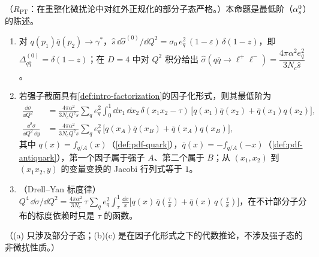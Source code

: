 \begin{proposition}\label{prop:dy-born}
（$R_{\mathrm{PT}}$：在重整化微扰论中对红外正规化的部分子态严格。）本命题是最低阶（$\alpha_s^0$）的陈述。
\begin{enumerate}[label=(\alph*),leftmargin=2.2em,itemsep=1pt,topsep=2pt]
\item 对 $q(p_1)\bar q(p_2)\to\gamma^*$，$\hat s\,\dd\hat\sigma^{(0)}/\dd Q^2=\sigma_0\,e_q^2\,(1-\varepsilon)\,\delta(1-z)$，即 $\Delta^{(0)}_{q\bar q}=\delta(1-z)$；在 $D=4$ 中对 $Q^2$ 积分给出 $\hat\sigma(q\bar q\to\ell^+\ell^-)=\dfrac{4\pi\alpha^2e_q^2}{3N_c\hat s}$。
\item 若强子截面具有\cref{def:intro-factorization}的因子化形式，则其最低阶为
\begin{align}
\frac{\dd\sigma}{\dd Q^2}&=\frac{4\pi\alpha^2}{3N_cQ^2s}\sum_qe_q^2\int_0^1\!\dd x_1\,\dd x_2\,\delta(x_1x_2-\tau)\,\big[q(x_1)\bar q(x_2)+\bar q(x_1)q(x_2)\big],\label{eq:dy-LO}\\
\frac{\dd^2\sigma}{\dd Q^2\,\dd y}&=\frac{4\pi\alpha^2}{3N_cQ^2s}\sum_qe_q^2\,\big[q(x_A)\bar q(x_B)+\bar q(x_A)q(x_B)\big],\label{eq:dy-LOy}
\end{align}
其中 $q(x)=f_{q/A}(x)$（\cref{def:pdf-quark}），$\bar q(x)=-f_{q/A}(-x)$（\cref{def:pdf-antiquark}），第一个因子属于强子 $A$、第二个属于 $B$；从 $(x_1,x_2)$ 到 $(x_1x_2,y)$ 的变量变换的 Jacobi 行列式等于 $1$。
\item （Drell--Yan 标度律）$Q^4\,\dd\sigma/\dd Q^2=\frac{4\pi\alpha^2}{3N_c}\,\tau\sum_qe_q^2\int_\tau^1\frac{\dd x}{x}\big[q(x)\,\bar q(\tfrac\tau x)+\bar q(x)\,q(\tfrac\tau x)\big]$，在不计部分子分布的标度依赖时只是 $\tau$ 的函数。
\end{enumerate}
（(a) 只涉及部分子态；(b)(c) 是在因子化形式之下的代数推论，不涉及强子态的非微扰性质。）
\end{proposition}

